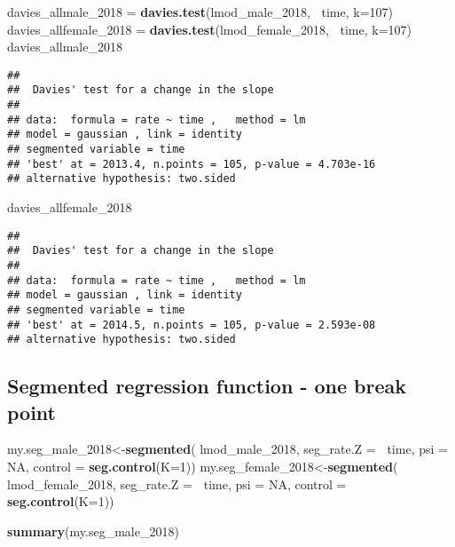 \documentclass[]{article}
\newenvironment{Shaded}{\begin{snugshade}}{\end{snugshade}}
\newcommand{\KeywordTok}[1]{\textcolor[rgb]{0.13,0.29,0.53}{\textbf{#1}}}
\newcommand{\DataTypeTok}[1]{\textcolor[rgb]{0.13,0.29,0.53}{#1}}
\newcommand{\DecValTok}[1]{\textcolor[rgb]{0.00,0.00,0.81}{#1}}
\newcommand{\StringTok}[1]{\textcolor[rgb]{0.31,0.60,0.02}{#1}}
\newcommand{\OtherTok}[1]{\textcolor[rgb]{0.56,0.35,0.01}{#1}}
\newcommand{\OperatorTok}[1]{\textcolor[rgb]{0.81,0.36,0.00}{\textbf{#1}}}
\newcommand{\NormalTok}[1]{#1}
\begin{document}
\begin{Shaded}
\begin{Highlighting}[]
\NormalTok{davies_allmale_}\DecValTok{2018}\NormalTok{ =}\StringTok{ }\KeywordTok{davies.test}\NormalTok{(lmod_male_}\DecValTok{2018}\NormalTok{, }\OperatorTok{~}\NormalTok{time, }\DataTypeTok{k=}\DecValTok{107}\NormalTok{)}
\NormalTok{davies_allfemale_}\DecValTok{2018}\NormalTok{ =}\StringTok{ }\KeywordTok{davies.test}\NormalTok{(lmod_female_}\DecValTok{2018}\NormalTok{, }\OperatorTok{~}\NormalTok{time, }\DataTypeTok{k=}\DecValTok{107}\NormalTok{)}
\NormalTok{davies_allmale_}\DecValTok{2018}
\end{Highlighting}
\end{Shaded}

\begin{verbatim}
## 
##  Davies' test for a change in the slope
## 
## data:  formula = rate ~ time ,   method = lm 
## model = gaussian , link = identity  
## segmented variable = time
## 'best' at = 2013.4, n.points = 105, p-value = 4.703e-16
## alternative hypothesis: two.sided
\end{verbatim}

\begin{Shaded}
\begin{Highlighting}[]
\NormalTok{davies_allfemale_}\DecValTok{2018}
\end{Highlighting}
\end{Shaded}

\begin{verbatim}
## 
##  Davies' test for a change in the slope
## 
## data:  formula = rate ~ time ,   method = lm 
## model = gaussian , link = identity  
## segmented variable = time
## 'best' at = 2014.5, n.points = 105, p-value = 2.593e-08
## alternative hypothesis: two.sided
\end{verbatim}

\subsection{Segmented regression function - one break
point}\label{segmented-regression-function---one-break-point}

\begin{Shaded}
\begin{Highlighting}[]
\NormalTok{ my.seg_male_}\DecValTok{2018}\NormalTok{<-}\KeywordTok{segmented}\NormalTok{(  lmod_male_}\DecValTok{2018}\NormalTok{, }\DataTypeTok{seg_rate.Z =} \OperatorTok{~}\NormalTok{time, }\DataTypeTok{psi =} \OtherTok{NA}\NormalTok{, }\DataTypeTok{control =} \KeywordTok{seg.control}\NormalTok{(}\DataTypeTok{K=}\DecValTok{1}\NormalTok{))}
\NormalTok{ my.seg_female_}\DecValTok{2018}\NormalTok{<-}\KeywordTok{segmented}\NormalTok{(  lmod_female_}\DecValTok{2018}\NormalTok{, }\DataTypeTok{seg_rate.Z =} \OperatorTok{~}\NormalTok{time, }\DataTypeTok{psi =} \OtherTok{NA}\NormalTok{, }\DataTypeTok{control =} \KeywordTok{seg.control}\NormalTok{(}\DataTypeTok{K=}\DecValTok{1}\NormalTok{))}
 
\KeywordTok{summary}\NormalTok{(my.seg_male_}\DecValTok{2018}\NormalTok{)}
\end{Highlighting}
\end{Shaded}
\end{document}
